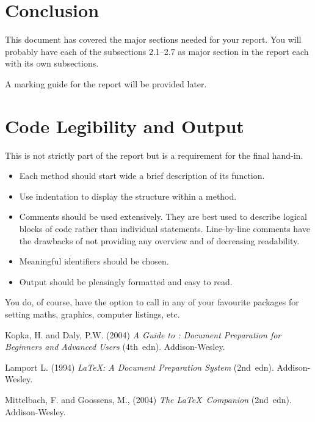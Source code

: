 \documentclass[11pt,a4paper]{article}
\begin{document}
\section{Conclusion}
\label{sec:conclusion}

This document has covered the major sections needed for your
report. You will probably have each of the subsections 2.1--2.7 as
major section in the report each with its own subsections. 

A marking guide for the report will be provided later.

\appendix
\section{Code Legibility and Output}

This is not strictly part of the report but is a requirement for the
final hand-in.

\begin{itemize}
\item Each method should start wide a brief description of its
  function.

\item Use indentation to display the structure within a method.

\item Comments should be used extensively. They are best used to
  describe logical blocks of code rather than individual
  statements. Line-by-line comments have the drawbacks of not
  providing any overview and of decreasing readability.

\item Meaningful identifiers should be chosen.

\item Output should be pleasingly formatted and easy to read.
\end{itemize}

You do, of course, have the option to call in any of your
favourite packages for setting maths, graphics, computer listings,
etc.

\begin{thebibliography}{9}

Kopka, H. and Daly, P.W.  (2004) \textit{A Guide to \LaTeXe:
Document Preparation for Beginners and Advanced Users} (4th~edn).
Addison-Wesley.

Lamport L. (1994) \textit{\LaTeX: A Document Preparation System}
(2nd~edn). Addison-Wesley.

Mittelbach, F. and Goossens, M., (2004) \textit{The \LaTeX\
Companion} (2nd~edn). Addison-Wesley.

\end{thebibliography}
\end{document}

